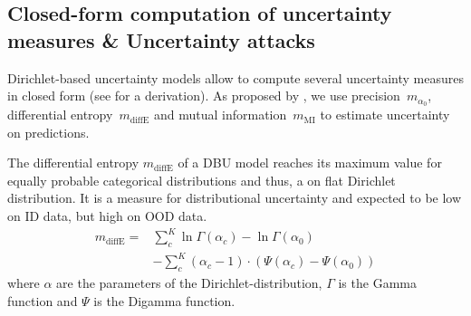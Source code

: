 %


\subsection{Closed-form computation of uncertainty measures \& Uncertainty attacks}
\label{subsec:appendix_measurecomp}

Dirichlet-based uncertainty models allow to compute several uncertainty measures in closed form (see \citep{malini2018} for a derivation). As proposed by \cite{malini2018}, we use precision~$m_{\alpha_0}$, differential entropy~$m_{\mathrm{diffE}}$ and mutual information~$m_{\mathrm{MI}}$ to estimate uncertainty on predictions.

The differential entropy $m_{\mathrm{diffE}}$ of a DBU model reaches its maximum value for equally probable categorical distributions and thus, a on flat Dirichlet distribution. It is a measure for distributional uncertainty and expected to be low on ID data, but high on OOD data. 
%
\begin{equation}
\begin{aligned}
	m_{\mathrm{diffE}}  = &\sum_c^K \ln \Gamma (\alpha_c) - \ln \Gamma (\alpha_0) \\
	&- \sum_c^K (\alpha_c -1) \cdot (\Psi (\alpha_c) - \Psi (\alpha_0))
\end{aligned}
\end{equation}
%
where $\alpha$ are the parameters of the Dirichlet-distribution, $\Gamma$ is the Gamma function and $\Psi$ is the Digamma function. 


